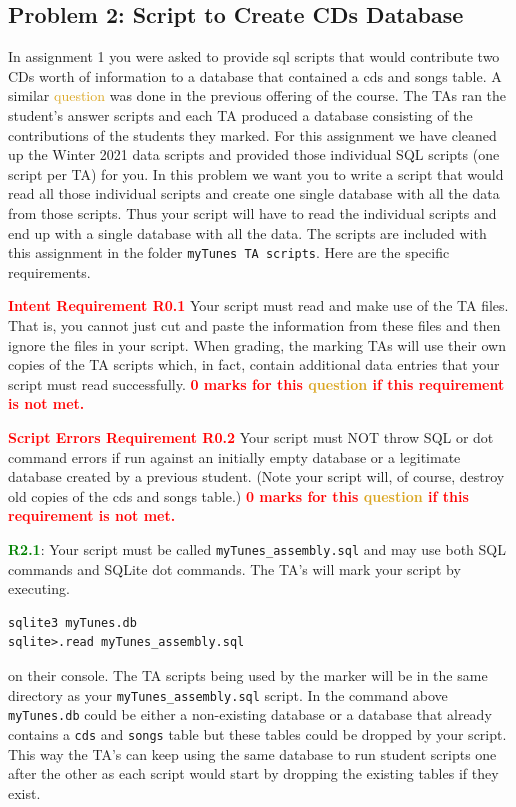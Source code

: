 \documentclass[12pt]{article}
\begin{document}
\hrulefill

\subsection{Problem 2: Script to Create CDs Database}
In assignment 1 you were asked to provide sql scripts that would contribute two CDs worth of information to a database that contained a cds and songs table. A similar \textcolor{goldenrod}{question} was done in the previous offering of the course. The TAs ran the student's answer scripts and each TA produced a database consisting of the contributions of the students they marked. For this assignment we have cleaned up the Winter 2021 data scripts and provided those individual SQL scripts (one script per TA) for you. In this problem we want you to write a script that would read all those individual scripts and create one single database with all the data from those scripts. Thus your script will have to read the individual scripts and end up with a single database with all the data. The scripts are included with this assignment in the folder \texttt{myTunes TA scripts}. Here are the specific requirements. \par

\textcolor{red}{\bfseries Intent Requirement R0.1} Your script must read and make use of the TA files. That is, you cannot just cut and paste the information from these files and then ignore the files in your script. When grading, the marking TAs will use their own copies of the TA scripts which, in fact, contain additional data entries that your script must read successfully. \textcolor{red}{\bfseries 0 marks for this \textcolor{goldenrod}{\bfseries question} if this requirement is not met.}

\textcolor{red}{\bfseries Script Errors Requirement R0.2}  Your script must NOT throw SQL or dot command errors if run against an initially empty database or a legitimate database created by a previous student. (Note your script will, of course, destroy old copies of the cds and songs table.) \textcolor{red}{\bfseries 0 marks for this \textcolor{goldenrod}{\bfseries question} if this requirement is not met.}

\textcolor{green}{\textbf{R2.1}}: Your script must be called \texttt{myTunes\_assembly.sql} and may use both SQL commands and SQLite dot commands. The TA's will mark your script by executing.
\begin{lstlisting}[style=sqlstyle]
sqlite3 myTunes.db
sqlite>.read myTunes_assembly.sql
\end{lstlisting}
on their console. The TA scripts being used by the marker will be in the same directory as your \texttt{myTunes\_assembly.sql} script. In the command above \texttt{myTunes.db} could be either a non-existing database or a database that already contains a \texttt{cds} and \texttt{songs} table but these tables could be dropped by your script. This way the TA's can keep using the same database to run student scripts one after the other as each script would start by dropping the existing tables if they exist.
\end{document}
